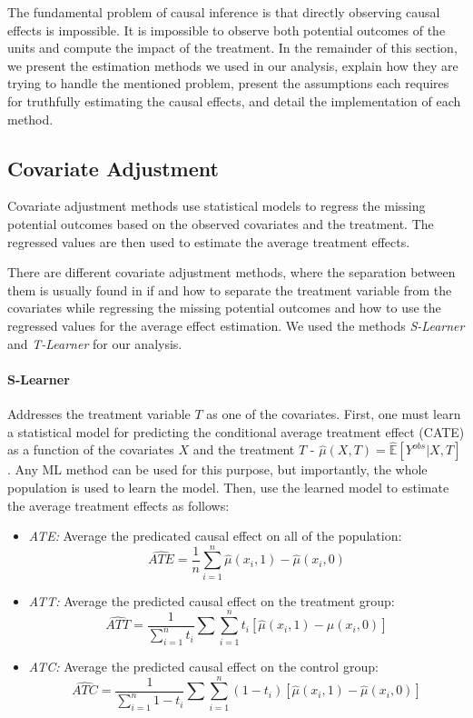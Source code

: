 \documentclass[11pt]{article}
\newcommand{\gur}[1]{{\color{teal}{Gur: #1}}}
\begin{document}
\gur{For the doubly robust, use the paper I put in the references and cite it for all three.}

The fundamental problem of causal inference is that directly observing causal effects is impossible. It is impossible to observe both potential outcomes of the units and compute the impact of the treatment. In the remainder of this section, we present the estimation methods we used in our analysis, explain how they are trying to handle the mentioned problem, present the assumptions each requires for truthfully estimating the causal effects, and detail the implementation of each method.


\subsection{Covariate Adjustment}

Covariate adjustment methods use statistical models to regress the missing potential outcomes based on the observed covariates and the treatment. The regressed values are then used to estimate the average treatment effects.

There are different covariate adjustment methods, where the separation between them is usually found in if and how to separate the treatment variable from the covariates while regressing the missing potential outcomes and how to use the regressed values for the average effect estimation. We used the methods \emph{S-Learner} and \emph{T-Learner} for our analysis.

\gur{Theoretical guarantees?}

\paragraph{S-Learner} Addresses the treatment variable $T$ as one of the covariates. First, one must learn a statistical model for predicting the conditional average treatment effect (CATE) as a function of the covariates $X$ and the treatment $T$ - $\hat{\mu}(X, T) = \hat{\mathbb{E}}[Y^{obs} | X, T]$. Any ML method can be used for this purpose, but importantly, the whole population is used to learn the model. Then, use the learned model to estimate the average treatment effects as follows:

\begin{itemize}
    \item \textit{ATE:} Average the predicated causal effect on all of the population:
    \[
    \widehat{ATE} = \frac{1}{n} \sum_{i=1}^{n} \hat{\mu}(x_i, 1) - \hat{\mu}(x_i, 0)
    \]
    \item \textit{ATT:} Average the predicted causal effect on the treatment group:
    \[
    \widehat{ATT} = \frac{1}{\sum_{i=1}^{n} t_i} \sum \sum_{i=1}^{n} t_i \left[ \hat{\mu}(x_i, 1) - \hat{\mu}(x_i, 0) \right] 
    \]
    \item \textit{ATC:} Average the predicted causal effect on the control group:
    \[
    \widehat{ATC} = \frac{1}{\sum_{i=1}^{n} 1 - t_i} \sum \sum_{i=1}^{n} (1 - t_i) \left[ \hat{\mu}(x_i, 1) - \hat{\mu}(x_i, 0) \right]
    \]
\end{itemize}
\end{document}
